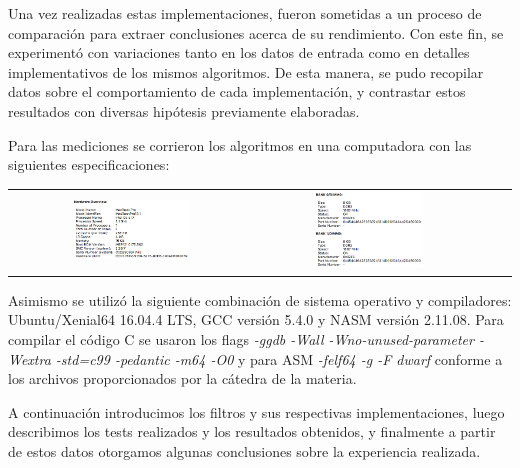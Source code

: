 Una vez realizadas estas implementaciones, fueron sometidas a un proceso de comparación para extraer conclusiones acerca de su rendimiento. Con este fin, se experimentó con variaciones tanto en los datos de entrada como en detalles implementativos de los mismos algoritmos. De esta manera, se pudo recopilar datos sobre el comportamiento de cada implementación, y contrastar estos resultados con diversas hipótesis previamente elaboradas.

Para las mediciones se corrieron los algoritmos en una computadora con las siguientes especificaciones:

\begin{center}
  \begin{tabular}{cccc}
    \includegraphics[width=0.5\textwidth]{imagenes/hardware.png} &
    \includegraphics[width=0.5\textwidth]{imagenes/memory.png} \\
  \end{tabular}
 \end{center}

 Asimismo se utilizó la siguiente combinación de sistema operativo y compiladores: Ubuntu/Xenial64 16.04.4 LTS, GCC versión 5.4.0 y NASM versión 2.11.08. Para compilar el código C se usaron los flags \textit{-ggdb -Wall -Wno-unused-parameter -Wextra -std=c99 -pedantic -m64 -O0} y para ASM \textit{-felf64 -g -F dwarf} conforme a los archivos proporcionados por la cátedra de la materia.


A continuación introducimos los filtros y sus respectivas implementaciones, luego describimos los tests realizados y los resultados obtenidos, y finalmente a partir de estos datos otorgamos algunas conclusiones sobre la experiencia realizada.